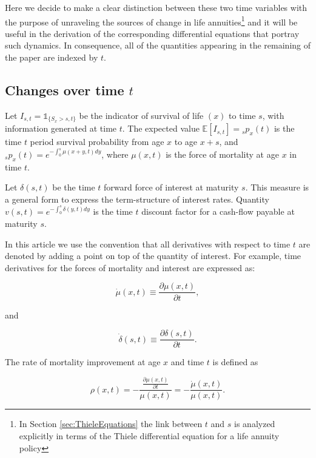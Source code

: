 \documentclass[12pt]{article}
\begin{document}
Here we decide to make a clear distinction between these two time variables with the purpose of unraveling the sources of change in life annuities\footnote{In Section \ref{sec:ThieleEquations} the link between $t$ and $s$ is analyzed explicitly in terms of the Thiele differential equation for a life annuity policy} and it will be useful in the derivation of the corresponding differential equations that portray such dynamics. In consequence, all of the quantities appearing in the remaining of the paper are indexed by $t$. 

\subsection{Changes over time $t$}

Let $I_{s,t}=\mathds{1}_{\{S_x>s,t\}}$ be the indicator of survival of life $(x)$ to time $s$, with information generated at time $t$. The expected value $\mathbb{E}[I_{s,t}]={}_sp_x(t)$ is the time $t$ period survival probability from age \(x\) to age \(x+s\), and ${}_sp_x(t)=e^{-\int_{0}^{s}\mu(x+y,t)dy}$, where \(\mu(x,t)\) is the force of mortality at age \(x\) in time $t$.

Let \(\delta(s,t)\) be the time $t$ forward force of interest at maturity $s$. This measure is a general form to express the term-structure of interest rates. Quantity ${v}(s,t)=e^{-\int_{0}^{s}\delta(y,t)dy}$ is the time $t$ discount factor for a cash-flow payable at maturity $s$.

In this article we use the convention that all derivatives with respect to time $t$ are denoted by adding a point on top of the quantity of interest. For example, time derivatives for the forces of mortality and interest are expressed as:

\begin{equation} \label{eq:mudot}
\dot{\mu}(x,t)\equiv\frac{\partial\mu(x,t)}{\partial t},
\end{equation}

and 

\begin{equation} \label{eq:mudot}
\dot{\delta}(s,t)\equiv\frac{\partial\delta(s,t)}{\partial t}.
\end{equation}

The rate of mortality improvement at age \(x\) and time $t$ is defined as

\begin{equation} \label{eq:rho}
\rho(x,t)=-\frac{\frac{\partial \mu(x,t)}{\partial t}}{\mu(x,t)} = - \frac{\dot{\mu}(x,t)}{\mu(x,t)}.
\end{equation}
\end{document}

